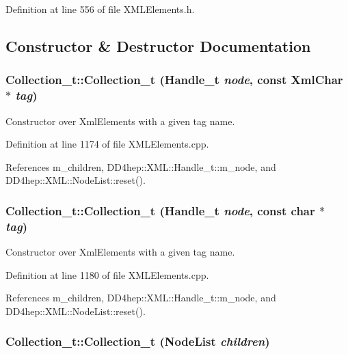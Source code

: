 Definition at line 556 of file XMLElements.h.

\subsection{Constructor \& Destructor Documentation}
\hypertarget{class_d_d4hep_1_1_x_m_l_1_1_collection__t_a46561de1f154c3b06435766504b9d3db}{
\subsubsection[{Collection\_\-t}]{\setlength{\rightskip}{0pt plus 5cm}Collection\_\-t::Collection\_\-t ({\bf Handle\_\-t} {\em node}, \/  const {\bf XmlChar} $\ast$ {\em tag})}}
\label{class_d_d4hep_1_1_x_m_l_1_1_collection__t_a46561de1f154c3b06435766504b9d3db}


Constructor over XmlElements with a given tag name. 

Definition at line 1174 of file XMLElements.cpp.

References m\_\-children, DD4hep::XML::Handle\_\-t::m\_\-node, and DD4hep::XML::NodeList::reset().\hypertarget{class_d_d4hep_1_1_x_m_l_1_1_collection__t_a65effa5c14bd2aef11552cc9737022f9}{
\subsubsection[{Collection\_\-t}]{\setlength{\rightskip}{0pt plus 5cm}Collection\_\-t::Collection\_\-t ({\bf Handle\_\-t} {\em node}, \/  const char $\ast$ {\em tag})}}
\label{class_d_d4hep_1_1_x_m_l_1_1_collection__t_a65effa5c14bd2aef11552cc9737022f9}


Constructor over XmlElements with a given tag name. 

Definition at line 1180 of file XMLElements.cpp.

References m\_\-children, DD4hep::XML::Handle\_\-t::m\_\-node, and DD4hep::XML::NodeList::reset().\hypertarget{class_d_d4hep_1_1_x_m_l_1_1_collection__t_a0db8adadf0bba07706766dbc027f5151}{
\subsubsection[{Collection\_\-t}]{\setlength{\rightskip}{0pt plus 5cm}Collection\_\-t::Collection\_\-t ({\bf NodeList} {\em children})}}
\label{class_d_d4hep_1_1_x_m_l_1_1_collection__t_a0db8adadf0bba07706766dbc027f5151}


